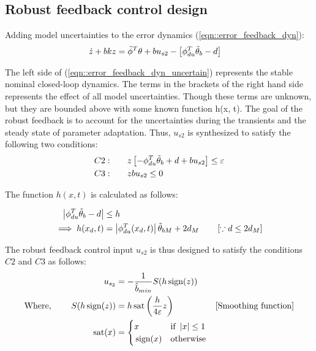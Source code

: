 \subsection{Robust feedback control design}

Adding model uncertainties to the error dynamics (\ref{eqn::error_feedback_dyn}):
\begin{align}
    \dot z + bk z &=  \tilde \phi^T \theta + bu_{s2} - \left[  \phi_{du}^T \tilde \theta_b - d \right]
    \label{eqn::error_feedback_dyn_uncertain}
\end{align}

The left side of (\ref{eqn::error_feedback_dyn_uncertain}) represents the
stable nominal closed-loop dynamics. The terms in the brackets of the right
hand side represents the effect of all model uncertainties. Though these terms
are unknown, but they are bounded above with some known function h(x, t). The
goal of the robust feedback is to account for the uncertainties during the
transients and the steady state of parameter adaptation. Thus, $u_{s2}$ is
synthesized to satisfy the following two conditions:
\begin{align}
    C2:& \qquad z \left[ -\phi_{du}^T \tilde \theta_b + d + b u_{s2} \right] \leq \varepsilon \\
    C3:& \qquad z b u_{s2} \leq 0
\end{align}


The function $h(x, t)$ is calculated as follows:

\begin{align}
    \left\lvert \phi_{du}^T \tilde \theta_b - d \right\rvert &\leq h\\
    \implies h(x_d, t) &= \left\lvert \phi_{du}^T(x_d, t) \right\rvert  \tilde \theta_{bM} + 2 d_M \qquad \left[ \because d \leq 2d_M  \right]
\end{align}

The robust feedback control input $u_{s2}$ is thus designed to satisfy the conditions $C2$ and $C3$ as follows:
\begin{align}
    u_{s_2} &= -\frac{1}{\hat b_{min}} S(h \,\text{sign}(z)) \label{eqn::robust_u}\\
    \text{Where,  } \qquad
    S(h \,\text{sign}(z)) &= h \,\text{sat} \left(  \frac{h}{4 \varepsilon} z \right) &[\text{Smoothing function}]\\
    \,\text{sat} (x) &= \begin{cases}
        x  & \text{if  } \left\lvert x \right\rvert \leq   1\\
        \,\text{sign}(x) &  \text{otherwise}
    \end{cases}
\end{align}

